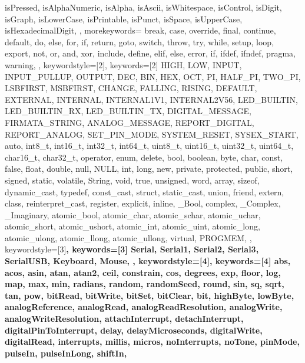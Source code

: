 {{		isPressed, isAlphaNumeric, isAlpha, isAscii, isWhitespace, isControl, 
		isDigit, isGraph, isLowerCase, isPrintable, isPunct, isSpace, 
		isUpperCase, isHexadecimalDigit, 
	}, 
	morekeywords={   %
		break, case, override, final, continue, default, do, else, for, 
		if, return, goto, switch, throw, try, while, setup, loop, export, 
		not, or, and, xor, include, define, elif, else, error, if, ifdef, 
		ifndef, pragma, warning,
	}, 
	keywordstyle=[2]\color{arduinoBlue},   
	keywords=[2]{   %
		HIGH, LOW, INPUT, INPUT_PULLUP, OUTPUT, DEC, BIN, HEX, OCT, PI, 
		HALF_PI, TWO_PI, LSBFIRST, MSBFIRST, CHANGE, FALLING, RISING, 
		DEFAULT, EXTERNAL, INTERNAL, INTERNAL1V1, INTERNAL2V56, LED_BUILTIN, 
		LED_BUILTIN_RX, LED_BUILTIN_TX, DIGITAL_MESSAGE, FIRMATA_STRING, 
		ANALOG_MESSAGE, REPORT_DIGITAL, REPORT_ANALOG, SET_PIN_MODE, 
		SYSTEM_RESET, SYSEX_START, auto, int8_t, int16_t, int32_t, int64_t, 
		uint8_t, uint16_t, uint32_t, uint64_t, char16_t, char32_t, operator, 
		enum, delete, bool, boolean, byte, char, const, false, float, double, 
		null, NULL, int, long, new, private, protected, public, short, 
		signed, static, volatile, String, void, true, unsigned, word, array, 
		sizeof, dynamic_cast, typedef, const_cast, struct, static_cast, union, 
		friend, extern, class, reinterpret_cast, register, explicit, inline, 
		_Bool, complex, _Complex, _Imaginary, atomic_bool, atomic_char, 
		atomic_schar, atomic_uchar, atomic_short, atomic_ushort, atomic_int, 
		atomic_uint, atomic_long, atomic_ulong, atomic_llong, atomic_ullong, 
		virtual, PROGMEM,
	},  
	keywordstyle=[3]\bfseries\color{arduinoOrange},
	keywords=[3]{  %
		Serial, Serial1, Serial2, Serial3, SerialUSB, Keyboard, Mouse,
	},      
	keywordstyle=[4]\color{arduinoOrange},
	keywords=[4]{  %
		abs, acos, asin, atan, atan2, ceil, constrain, cos, degrees, exp, 
		floor, log, map, max, min, radians, random, randomSeed, round, sin, 
		sq, sqrt, tan, pow, bitRead, bitWrite, bitSet, bitClear, bit, 
		highByte, lowByte, analogReference, analogRead, 
		analogReadResolution, analogWrite, analogWriteResolution, 
		attachInterrupt, detachInterrupt, digitalPinToInterrupt, delay, 
		delayMicroseconds, digitalWrite, digitalRead, interrupts, millis, 
		micros, noInterrupts, noTone, pinMode, pulseIn, pulseInLong, shiftIn, 
}}
